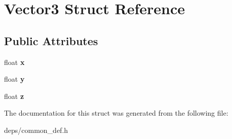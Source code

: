 \hypertarget{struct_vector3}{}\section{Vector3 Struct Reference}
\label{struct_vector3}
\subsection*{Public Attributes}
\begin{DoxyCompactItemize}
\item 
\mbox{\label{struct_vector3_a7e2d3237b29a2f29d7b3d8b2934e35f2}} 
float {\bfseries x}
\item 
\mbox{\label{struct_vector3_a86eb35a9fa2d5a49e7fad66a35fa9c13}} 
float {\bfseries y}
\item 
\mbox{\label{struct_vector3_aa8c9461eb24bd2c364258078811a3e9d}} 
float {\bfseries z}
\end{DoxyCompactItemize}


The documentation for this struct was generated from the following file\+:\begin{DoxyCompactItemize}
\item 
deps/common\+\_\+def.\+h\end{DoxyCompactItemize}
